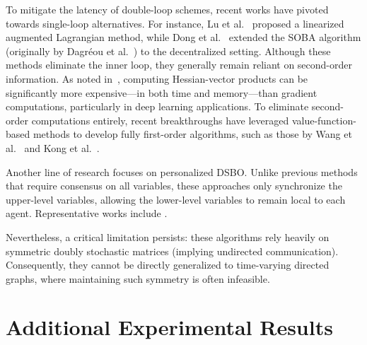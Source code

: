 \documentclass{article}
\theoremstyle{plain}
\theoremstyle{definition}
\theoremstyle{remark}
\begin{document}
To mitigate the latency of double-loop schemes, recent works have pivoted towards single-loop alternatives. 
For instance, Lu et al.~ proposed a linearized augmented Lagrangian method, while Dong et al.~ extended the SOBA algorithm (originally by Dagr\'eou et al.~) to the decentralized setting. 
Although these methods eliminate the inner loop, they generally remain reliant on second-order information. As noted in~\citet{dagreou2024compute}, computing Hessian-vector products can be significantly more expensive—in both time and memory—than gradient computations, particularly in deep learning applications. To eliminate second-order computations entirely, recent breakthroughs have leveraged value-function-based methods to develop fully first-order algorithms, such as those by Wang et al.~ and Kong et al.~. 

Another line of research focuses on personalized DSBO. 
Unlike previous methods that require consensus on all variables, these approaches only synchronize the upper-level variables, allowing the lower-level variables to remain local to each agent. 
Representative works include \cite{LiuPDBO2022, QiuPDBO2023,LiuPDBO2023, NiuPDBO2025, qin2025duet}.

Nevertheless, a critical limitation persists: these algorithms rely heavily on symmetric doubly stochastic matrices (implying undirected communication). Consequently, they cannot be directly generalized to time-varying directed graphs, where maintaining such symmetry is often infeasible.

\section{Additional Experimental Results}
\label{app:extra_exp}
\end{document}
